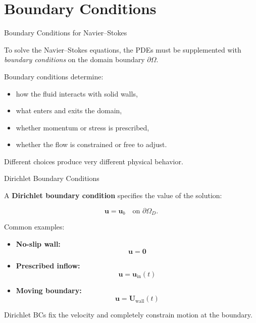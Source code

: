 \documentclass[aspectratio=169]{beamer}
\begin{document}
\section{Boundary Conditions}

\begin{frame}{Boundary Conditions for Navier--Stokes}

To solve the Navier--Stokes equations, the PDEs must be supplemented with
\emph{boundary conditions} on the domain boundary $\partial\Omega$.

\medskip

Boundary conditions determine:
\begin{itemize}
  \item how the fluid interacts with solid walls,
  \item what enters and exits the domain,
  \item whether momentum or stress is prescribed,
  \item whether the flow is constrained or free to adjust.
\end{itemize}

Different choices produce very different physical behavior.

\end{frame}

\begin{frame}{Dirichlet Boundary Conditions}

A \textbf{Dirichlet boundary condition} specifies the value of the solution:

\[
\mathbf{u} = \mathbf{u}_b \quad \text{on } \partial\Omega_D.
\]

Common examples:
\begin{itemize}
  \item \textbf{No-slip wall:}
        \[
        \mathbf{u} = \mathbf{0}
        \]
  \item \textbf{Prescribed inflow:}
        \[
        \mathbf{u} = \mathbf{u}_{\text{in}}(t)
        \]
  \item \textbf{Moving boundary:}
        \[
        \mathbf{u} = \mathbf{U}_{\text{wall}}(t)
        \]
\end{itemize}

Dirichlet BCs fix the velocity and completely constrain motion at the boundary.

\end{frame}
\end{document}
